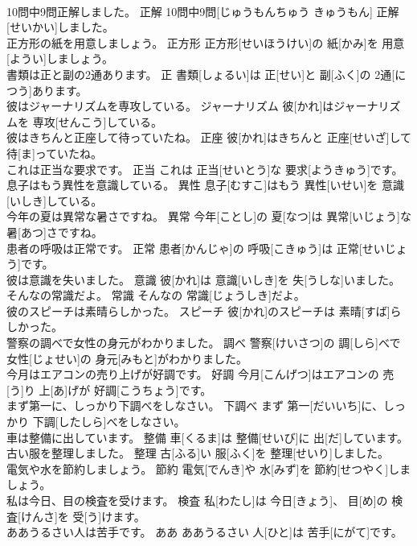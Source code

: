 \documentclass[8pt]{extreport}
\begin{document}
\begin{CJK}{UTF8}{min}
\\	10問中9問正解しました。	正解	10問中9問[じゅうもんちゅう きゅうもん] 正解[せいかい]しました。	
\\	正方形の紙を用意しましょう。	正方形	正方形[せいほうけい]の 紙[かみ]を 用意[ようい]しましょう。	
\\	書類は正と副の2通あります。	正	書類[しょるい]は 正[せい]と 副[ふく]の 2通[につう]あります。	
\\	彼はジャーナリズムを専攻している。	ジャーナリズム	彼[かれ]はジャーナリズムを 専攻[せんこう]している。	
\\	彼はきちんと正座して待っていたね。	正座	彼[かれ]はきちんと 正座[せいざ]して 待[ま]っていたね。	
\\	これは正当な要求です。	正当	これは 正当[せいとう]な 要求[ようきゅう]です。	
\\	息子はもう異性を意識している。	異性	息子[むすこ]はもう 異性[いせい]を 意識[いしき]している。	
\\	今年の夏は異常な暑さですね。	異常	今年[ことし]の 夏[なつ]は 異常[いじょう]な 暑[あつ]さですね。	
\\	患者の呼吸は正常です。	正常	患者[かんじゃ]の 呼吸[こきゅう]は 正常[せいじょう]です。	
\\	彼は意識を失いました。	意識	彼[かれ]は 意識[いしき]を 失[うしな]いました。	
\\	そんなの常識だよ。	常識	そんなの 常識[じょうしき]だよ。	
\\	彼のスピーチは素晴らしかった。	スピーチ	彼[かれ]のスピーチは 素晴[すば]らしかった。	
\\	警察の調べで女性の身元がわかりました。	調べ	警察[けいさつ]の 調[しら]べで 女性[じょせい]の 身元[みもと]がわかりました。	
\\	今月はエアコンの売り上げが好調です。	好調	今月[こんげつ]はエアコンの 売[う]り 上[あ]げが 好調[こうちょう]です。	
\\	まず第一に、しっかり下調べをしなさい。	下調べ	まず 第一[だいいち]に、しっかり 下調[したしら]べをしなさい。	
\\	車は整備に出しています。	整備	車[くるま]は 整備[せいび]に 出[だ]しています。	
\\	古い服を整理しました。	整理	古[ふる]い 服[ふく]を 整理[せいり]しました。	
\\	電気や水を節約しましょう。	節約	電気[でんき]や 水[みず]を 節約[せつやく]しましょう。	
\\	私は今日、目の検査を受けます。	検査	私[わたし]は 今日[きょう]、 目[め]の 検査[けんさ]を 受[う]けます。	
\\	ああうるさい人は苦手です。	ああ	ああうるさい 人[ひと]は 苦手[にがて]です。	

\end{CJK}
\end{document}
